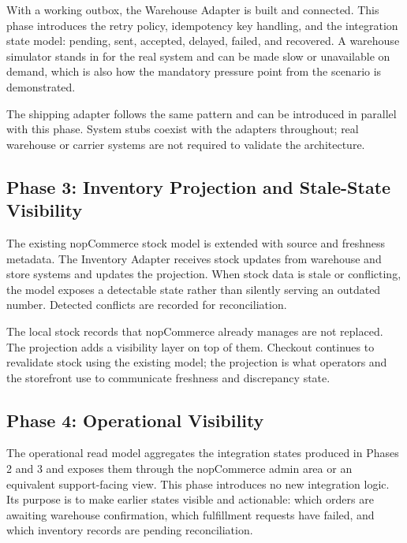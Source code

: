 With a working outbox, the Warehouse Adapter is built and connected. This phase introduces the
retry policy, idempotency key handling, and the integration state model: pending, sent,
accepted, delayed, failed, and recovered. A warehouse simulator stands in for the real system
and can be made slow or unavailable on demand, which is also how the mandatory pressure point
from the scenario is demonstrated.

The shipping adapter follows the same pattern and can be introduced in parallel with this
phase. System stubs coexist with the adapters throughout; real warehouse or carrier systems
are not required to validate the architecture.

\subsection{Phase 3: Inventory Projection and Stale-State Visibility}

The existing nopCommerce stock model is extended with source and freshness metadata. The
Inventory Adapter receives stock updates from warehouse and store systems and updates the
projection. When stock data is stale or conflicting, the model exposes a detectable state
rather than silently serving an outdated number. Detected conflicts are recorded for
reconciliation.

The local stock records that nopCommerce already manages are not replaced. The projection adds
a visibility layer on top of them. Checkout continues to revalidate stock using the existing
model; the projection is what operators and the storefront use to communicate freshness and
discrepancy state.

\subsection{Phase 4: Operational Visibility}

The operational read model aggregates the integration states produced in Phases 2 and 3 and
exposes them through the nopCommerce admin area or an equivalent support-facing view. This
phase introduces no new integration logic. Its purpose is to make earlier states visible and
actionable: which orders are awaiting warehouse confirmation, which fulfillment requests have
failed, and which inventory records are pending reconciliation.
